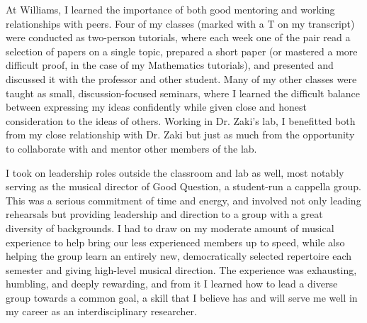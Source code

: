 \documentclass[12pt]{article}
\begin{document}
At Williams, I learned the importance of both good mentoring and working relationships with peers.  Four of my classes (marked with a T on my transcript) were conducted as two-person tutorials, where each week one of the pair read a selection of papers on a single topic, prepared a short paper (or mastered a more difficult proof, in the case of my Mathematics tutorials), and presented and discussed it with the professor and other student.  
Many of my other classes were taught as small, discussion-focused seminars, where I learned the difficult balance between expressing my ideas confidently while given close and honest consideration to the ideas of others.  
 Working in Dr. Zaki's lab, I benefitted both from my close relationship with Dr. Zaki but just as much from the opportunity to collaborate with and mentor other members of the lab.  



I took on leadership roles outside the classroom and lab as well, most notably serving as the musical director of Good Question, a student-run a cappella group.  This was a serious commitment of time and energy, and involved not only leading rehearsals but providing leadership and direction to a group with a great diversity of backgrounds.  I had to draw on my moderate amount of musical experience to help bring our less experienced members up to speed, while also helping the group learn an entirely new, democratically selected repertoire each semester and giving high-level musical direction.  The experience was exhausting, humbling, and deeply rewarding, and from it I learned how to lead a diverse group towards a common goal, a skill that I believe has and will serve me well in my career as an interdisciplinary researcher.

\end{document}
